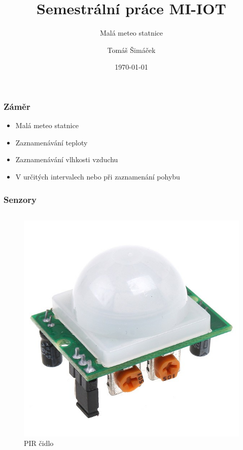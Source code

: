 \documentclass{beamer}
\title{Semestrální práce MI-IOT}
\subtitle{Malá meteo statnice}
\author{Tomáš Šimáček}
\institute[ČVUT]{České vysoké učení technické}
\date{\today}
\begin{document}
	\begin{frame}
	\titlepage
	\end{frame}
	
	\begin{frame}
		\frametitle{Záměr}
		\begin{itemize}
			\item Malá meteo statnice
			\item Zaznamenávání teploty
			\item Zaznamenávání vlhkosti vzduchu
			\item V určitých intervalech nebo při zaznamenání pohybu
		\end{itemize}
	\end{frame}

	\begin{frame}
		\frametitle{Senzory}		
		\begin{columns}
			\column{0.5\textwidth}	
				\begin{figure}
					\includegraphics[scale=0.2]{pir.jpg}	
					\caption{PIR čidlo}
				\end{figure}		
				

\end{columns}
\end{frame}
\end{document}
